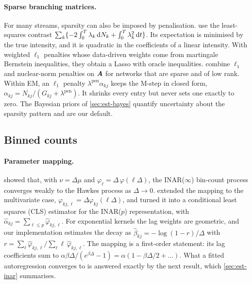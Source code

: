 \paragraph{Sparse branching matrices.} For many streams, sparsity can also be imposed by
penalisation.  use the least-squares contrast
$\sum_k\{-2\int_0^T\lambda_k\,\mathrm{d}N_k+\int_0^T\lambda_k^2\,\mathrm{d} t\}$. Its expectation is
minimised by the true intensity, and it is quadratic in the coefficients of a linear
intensity. With weighted $\ell_1$ penalties whose data-driven weights come from
martingale Bernstein inequalities, they obtain a Lasso with oracle inequalities.
 combine $\ell_1$ and nuclear-norm penalties on $\bm{A}$ for networks that
are sparse and of low rank. Within EM, an $\ell_1$ penalty $\lambda^{\mathrm{pen}}\alpha_{kj}$
keeps the M-step in closed form, $\alpha_{kj}=N_{kj}/(G_{kj}+\lambda^{\mathrm{pen}})$. It
shrinks every entry but never sets one exactly to zero. The Bayesian priors of
\cref{sec:est-bayes} quantify uncertainty about the sparsity pattern and are our default.

\subsection{Binned counts}\label{app:est-inar}

\paragraph{Parameter mapping.}  showed that, with $\nu=\Delta\mu$ and
$\varphi_\ell=\Delta\,\varphi(\ell\Delta)$, the INAR($\infty$) bin-count process converges
weakly to the Hawkes process as $\Delta\to0$.  extended the mapping to
the multivariate case, $\varphi_{kj,\ell}=\Delta\varphi_{kj}(\ell\Delta)$, and turned it into a
conditional least squares (CLS) estimator for the INAR($p$) representation, with
$\hat\alpha_{kj}=\sum_{\ell\le p}\hat\varphi_{kj,\ell}$. For exponential kernels the lag
weights are geometric, and our implementation estimates the decay as
$\hat\beta_{kj}=-\log(1-r)/\Delta$ with
$r=\sum_\ell\hat\varphi_{kj,\ell}/\sum_\ell\ell\,\hat\varphi_{kj,\ell}$. The mapping is a
first-order statement: its lag coefficients sum to
$\alpha\beta\Delta/(e^{\beta\Delta}-1)=\alpha(1-\beta\Delta/2+\dots)$. What a fitted
autoregression converges to is answered exactly by the next result, which
\cref{sec:est-inar} summarises.

